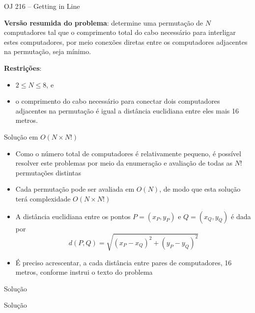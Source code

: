 \begin{frame}[fragile]{OJ 216 -- Getting in Line}

    \textbf{Versão resumida do problema}: determine uma permutação de $N$ computadores tal que
        o comprimento total do cabo necessário para interligar estes computadores, por meio
        conexões diretas entre os computadores adjacentes na permutação, seja mínimo.
            
    \vspace{0.1in}

    \textbf{Restrições}:
    \begin{itemize}
        \item $2\leq N\leq 8$, e
        \item o comprimento do cabo necessário para conectar dois computadores adjacentes na
            permutação é igual a distância euclidiana entre eles mais 16 metros.
    \end{itemize}
\end{frame}

\begin{frame}[fragile]{Solução em $O(N\times N!)$ }

    \begin{itemize}
        \item Como o número total de computadores é relativamente pequeno, é possível
            resolver este problemas por meio da enumeração e avaliação de todas as $N!$
            permutações distintas

        \item Cada permutação pode ser avaliada em $O(N)$, de modo que esta solução terá 
            complexidade $O(N\times N!)$

        \item A distância euclidiana entre os pontos $P = (x_P, y_P)$ e $Q = (x_Q, y_Q)$ é dada
            por
        $$
            d(P, Q) = \sqrt{(x_P - x_Q)^2 + (y_P - y_Q)^2}
        $$

        \item É preciso acrescentar, a cada distância entre pares de computadores, 16 metros,
            conforme instrui o texto do problema
    \end{itemize}

\end{frame}

\begin{frame}[fragile]{Solução}
\end{frame}

\begin{frame}[fragile]{Solução}
\end{frame}
